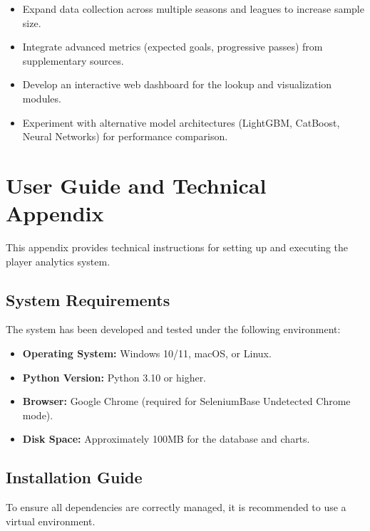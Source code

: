 \documentclass[a4paper,12pt]{report}
\begin{document}
\begin{itemize}
    \item Expand data collection across multiple seasons and leagues to increase sample size.
    \item Integrate advanced metrics (expected goals, progressive passes) from supplementary sources.
    \item Develop an interactive web dashboard for the lookup and visualization modules.
    \item Experiment with alternative model architectures (LightGBM, CatBoost, Neural Networks) for performance comparison.
\end{itemize}



\appendix
\chapter{User Guide and Technical Appendix}

This appendix provides technical instructions for setting up and executing the player analytics system.

\section{System Requirements}

The system has been developed and tested under the following environment:
\begin{itemize}
    \item \textbf{Operating System:} Windows 10/11, macOS, or Linux.
    \item \textbf{Python Version:} Python 3.10 or higher.
    \item \begin{sloppypar} \textbf{Browser:} Google Chrome (required for SeleniumBase Undetected Chrome mode). \end{sloppypar}
    \item \textbf{Disk Space:} Approximately 100MB for the database and charts.
\end{itemize}

\section{Installation Guide}

To ensure all dependencies are correctly managed, it is recommended to use a virtual environment.
\end{document}
